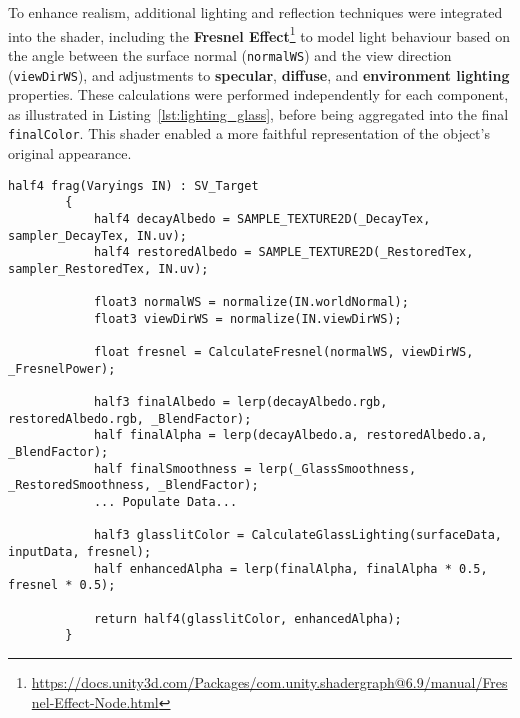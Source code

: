To enhance realism, additional lighting and reflection techniques were integrated into the shader, including 
the \textbf{Fresnel Effect}\footnote{\url{https://docs.unity3d.com/Packages/com.unity.shadergraph@6.9/manual/Fresnel-Effect-Node.html}} to model light behaviour based on the angle between the surface normal (\texttt{normalWS}) and the view direction (\texttt{viewDirWS}), 
and adjustments to \textbf{specular}, \textbf{diffuse}, and \textbf{environment lighting} properties. 
These calculations were performed independently for each component, as illustrated in Listing~\ref{lst:lighting_glass}, before being aggregated into the final \texttt{finalColor}. 
This shader enabled a more faithful representation of the object's original appearance.

\newpage
\begin{lstlisting}[language=HLSL, caption={Partial Fragment shader for blending original and restored textures.}, label={lst:shader_blend}]
        half4 frag(Varyings IN) : SV_Target
        {
            half4 decayAlbedo = SAMPLE_TEXTURE2D(_DecayTex, sampler_DecayTex, IN.uv);
            half4 restoredAlbedo = SAMPLE_TEXTURE2D(_RestoredTex, sampler_RestoredTex, IN.uv);

            float3 normalWS = normalize(IN.worldNormal);
            float3 viewDirWS = normalize(IN.viewDirWS);

            float fresnel = CalculateFresnel(normalWS, viewDirWS, _FresnelPower);

            half3 finalAlbedo = lerp(decayAlbedo.rgb, restoredAlbedo.rgb, _BlendFactor);
            half finalAlpha = lerp(decayAlbedo.a, restoredAlbedo.a, _BlendFactor);
            half finalSmoothness = lerp(_GlassSmoothness, _RestoredSmoothness, _BlendFactor);
            ... Populate Data...
            
            half3 glasslitColor = CalculateGlassLighting(surfaceData, inputData, fresnel);            
            half enhancedAlpha = lerp(finalAlpha, finalAlpha * 0.5, fresnel * 0.5);
            
            return half4(glasslitColor, enhancedAlpha);
        }
\end{lstlisting}


